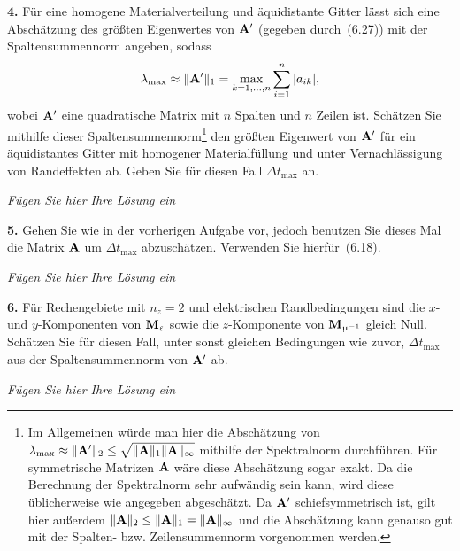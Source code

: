 \documentclass[Protokollheft.tex]{subfiles}
\begin{document}
\begin{framed}
	\noindent \textbf{4.} Für eine homogene Materialverteilung und äquidistante Gitter
    lässt sich eine Abschätzung des größten Eigenwertes von $ \mathbf{A} '$ (gegeben durch~(6.27)) mit der Spaltensummennorm angeben, sodass~
    \begin{align}
        \lambda_{\text{max}} \approx\| \mathbf{A} '\|_1=\max_{k=1,\ldots,n} \sum_{i=1}^n |a_{ik}|,
    \end{align}
    wobei $ \mathbf{A} '$ eine quadratische Matrix mit $n$ Spalten und $n$ Zeilen
    ist. Schätzen Sie mithilfe dieser Spaltensummennorm\footnote{Im Allgemeinen würde man hier die Abschätzung von $\lambda_{\text{max}}\approx\| \mathbf{A} '\|_2\le\sqrt{\| \mathbf{A} \|_1\| \mathbf{A} \|_\infty}$ mithilfe der Spektralnorm durchführen. Für symmetrische Matrizen $ \mathbf{A} $ wäre diese Abschätzung sogar exakt. Da die Berechnung der Spektralnorm sehr aufwändig sein kann, wird diese üblicherweise wie angegeben abgeschätzt. Da $ \mathbf{A} '$ schiefsymmetrisch ist, gilt hier außerdem ${\| \mathbf{A} \|_2\le\| \mathbf{A} \|_1=\| \mathbf{A} \|_\infty}$ und die Abschätzung kann genauso gut mit der Spalten- bzw. Zeilensummennorm vorgenommen werden.}
    den größten Eigenwert von $ \mathbf{A} '$ für ein äquidistantes Gitter mit
    homogener Materialfüllung und unter Vernachlässigung von Randeffekten ab. Geben Sie für diesen Fall $\Delta t_{\text{max}}$ an.\label{exer:approxEVofAprime}
\end{framed}

\emph{Fügen Sie hier Ihre Lösung ein}

\begin{framed}
	\noindent \textbf{5.} Gehen Sie wie in der vorherigen Aufgabe vor, jedoch benutzen Sie
    dieses Mal die Matrix $ \mathbf{A} $ um $\Delta t_{\text{max}}$ abzuschätzen. Verwenden Sie hierfür~(6.18).\label{exer:approxEVofA}
\end{framed}

\emph{Fügen Sie hier Ihre Lösung ein}

\begin{framed}
	\noindent \textbf{6.} Für Rechengebiete mit $n_z=2$ und elektrischen
    Randbedingungen sind die $x$- und $y$-Komponenten von $\mathbf{M}_{\upvarepsilon}$ sowie die
    $z$-Komponente von $\mathbf{M}_{\upmu^{-1}}$ gleich Null. Schätzen Sie für diesen Fall,
    unter sonst gleichen Bedingungen wie zuvor, $\Delta t_{\text{max}}$ aus
    der Spaltensummennorm von $ \mathbf{A} '$ ab.\label{exer:approxDeltaTmax}
\end{framed}

\emph{Fügen Sie hier Ihre Lösung ein}
\end{document}
